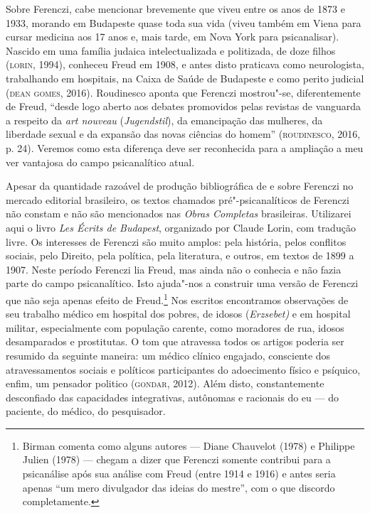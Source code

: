 Sobre Ferenczi, cabe mencionar brevemente que viveu entre os anos de
1873 e 1933, morando em Budapeste quase toda sua vida (viveu também em
Viena para cursar medicina aos 17 anos e, mais tarde, em Nova York
para psicanalisar). Nascido em uma família judaica intelectualizada e
politizada, de doze filhos (\textsc{lorin}, 1994), conheceu Freud em 1908, e
antes disto praticava como neurologista, trabalhando em hospitais, na
Caixa de Saúde de Budapeste e como perito judicial (\textsc{dean gomes}, 2016).
Roudinesco aponta que Ferenczi mostrou"-se, diferentemente de Freud,
``desde logo aberto aos debates promovidos pelas revistas de vanguarda a
respeito da \emph{art nouveau} (\emph{Jugendstil}), da emancipação das
mulheres, da liberdade sexual e da expansão das novas ciências do
homem'' (\textsc{roudinesco}, 2016, p. 24). Veremos como esta diferença deve ser
reconhecida para a ampliação a meu ver vantajosa do campo psicanalítico
atual.

Apesar da quantidade razoável de produção bibliográfica de e sobre
Ferenczi no mercado editorial brasileiro, os textos chamados
pré"-psicanalíticos de Ferenczi não constam e não são mencionados nas
\emph{Obras Completas} brasileiras. Utilizarei aqui o livro \emph{Les Écrits de
Budapest}, organizado por Claude Lorin, com tradução livre. Os
interesses de Ferenczi são muito amplos: pela história, pelos conflitos
sociais, pelo Direito, pela política, pela literatura, e outros, em
textos de 1899 a 1907. Neste período Ferenczi lia Freud, mas ainda não o
conhecia e não fazia parte do campo psicanalítico. Isto ajuda"-nos a
construir uma versão de Ferenczi que não seja apenas efeito de
Freud.\footnote{Birman comenta como alguns autores --- Diane Chauvelot
  (1978) e Philippe Julien (1978) --- chegam a dizer que Ferenczi somente
  contribui para a psicanálise após sua análise com Freud (entre 1914 e
  1916) e antes seria apenas ``um mero divulgador das ideias do mestre'',
  com o que discordo completamente.} Nos escritos encontramos
observações de seu trabalho médico em hospital dos pobres, de idosos
(\emph{Erzsebet)} e em hospital militar, especialmente com população
carente, como moradores de rua, idosos desamparados e prostitutas. O
tom que atravessa todos os artigos poderia ser resumido da seguinte
maneira: um médico clínico engajado, consciente dos atravessamentos
sociais e políticos participantes do adoecimento físico e psíquico,
enfim, um pensador politico (\textsc{gondar}, 2012). Além disto, constantemente
desconfiado das capacidades integrativas, autônomas e racionais do eu ---
do paciente, do médico, do pesquisador.

